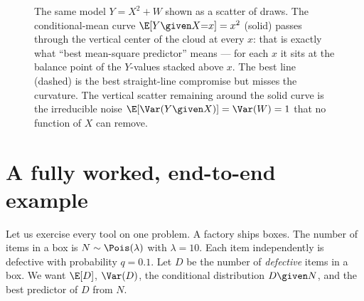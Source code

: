 \begin{figure}[H]
\centering
{}
\caption{The same model $Y = X^2 + W$ shown as a scatter of draws. The conditional-mean curve
$\E[Y\given X{=}x] = x^2$ (solid) passes through the vertical center of the cloud at every $x$: that is
exactly what ``best mean-square predictor'' means --- for each $x$ it sits at the balance point of the
$Y$-values stacked above $x$. The best line (dashed) is the best straight-line compromise but misses the
curvature. The vertical scatter remaining around the solid curve is the irreducible noise
$\E[\Var(Y\given X)] = \Var(W) = 1$ that no function of $X$ can remove.}
\label{ch15:fig-scatter}
\end{figure}

\section{A fully worked, end-to-end example}
\label{ch15:worked}

Let us exercise every tool on one problem. A factory ships boxes. The number of items in a box is
$N \sim \Pois(\lambda)$ with $\lambda = 10$. Each item independently is defective with probability
$q = 0.1$. Let $D$ be the number of \emph{defective} items in a box. We want $\E[D]$, $\Var(D)$, the
conditional distribution $D \given N$, and the best predictor of $D$ from $N$.

